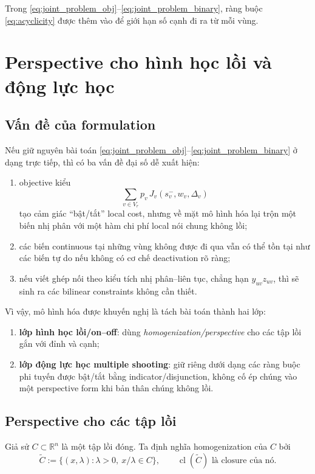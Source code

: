 \documentclass[12pt]{article}
\begin{document}
Trong \eqref{eq:joint_problem_obj}--\eqref{eq:joint_problem_binary}, ràng buộc \eqref{eq:acyclicity} được thêm vào để giới hạn số cạnh đi ra từ mỗi vùng.

\section{Perspective cho hình học lồi và động lực học}

\subsection{Vấn đề của formulation}
Nếu giữ nguyên bài toán \eqref{eq:joint_problem_obj}--\eqref{eq:joint_problem_binary} ở dạng trực tiếp, thì có ba vấn đề đại số dễ xuất hiện:
\begin{enumerate}
    \item objective kiểu
    \[
    \sum_{v\in V_r} p_v\,J_v(s_v^-,w_v,\Delta_v)
    \]
    tạo cảm giác ``bật/tắt'' local cost, nhưng về mặt mô hình hóa lại trộn một biến nhị phân với một hàm chi phí local nói chung không lồi;
    \item các biến continuous tại những vùng không được đi qua vẫn có thể tồn tại như các biến tự do nếu không có cơ chế deactivation rõ ràng;
    \item nếu viết ghép nối theo kiểu tích nhị phân--liên tục, chẳng hạn $y_{uv}z_{uv}$, thì sẽ sinh ra các bilinear constraints không cần thiết.
\end{enumerate}

Vì vậy, mô hình hóa được khuyến nghị là tách bài toán thành hai lớp:
\begin{enumerate}
    \item \textbf{lớp hình học lồi/on--off}: dùng \emph{homogenization/perspective} cho các tập lồi gắn với đỉnh và cạnh;
    \item \textbf{lớp động lực học multiple shooting}: giữ riêng dưới dạng các ràng buộc phi tuyến được bật/tắt bằng indicator/disjunction, không cố ép chúng vào một perspective form khi bản thân chúng không lồi.
\end{enumerate}

\subsection{Perspective cho các tập lồi}
Giả sử $C\subset\mathbb R^n$ là một tập lồi đóng. Ta định nghĩa homogenization của $C$ bởi
\begin{equation}
\widetilde C:=\{(x,\lambda):\lambda>0,\ x/\lambda\in C\},
\qquad
\operatorname{cl}(\widetilde C)
\text{ là closure của nó.}
\label{eq:homogenized-set}
\end{equation}
\end{document}
